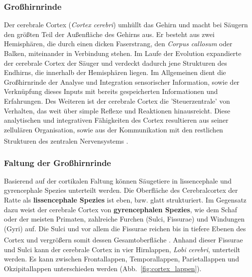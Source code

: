 \documentclass[12pt,a4paper,pdftex]{article}
\begin{document}
\subsubsection{Großhirnrinde}
\label{subsubsec:Grosshirnrinde}

Der cerebrale Cortex (\textit{Cortex cerebri})  umhüllt das Gehirn und macht bei Säugern den größten Teil der Außenfläche des Gehirns aus. Er besteht aus zwei Hemisphären, die durch einen dicken Faserstrang, den \textit{Corpus callosum}  oder Balken, miteinander in Verbindung stehen. Im Laufe der Evolution expandierte der cerebrale Cortex der Säuger und verdeckt dadurch jene Strukturen des Endhirns, die innerhalb der Hemisphären liegen. Im Allgemeinen dient die Großhirnrinde der Analyse und Integration sensorischer Information, sowie der Verknüpfung  dieses Inputs mit bereits gespeicherten Informationen und Erfahrungen. Des Weiteren ist der cerebrale Cortex die 'Steuerzentrale' von Verhalten, das weit über simple Reflexe und Reaktionen hinausreicht. Diese analytischen und integrativen Fähigkeiten des Cortex resultieren aus seiner zellulären Organisation, sowie aus der Kommunikation mit den restlichen Strukturen des zentralen Nervensystems \textsuperscript{\cite[7]{watson2010thebrain}}.


\subsubsection*{Faltung der Großhirnrinde}

Basierend auf der cortikalen Faltung können Säugetiere in lissencephale und gyrencephale Spezies unterteilt werden. Die Oberfläche des Cerebralcortex der Ratte als \textbf{lissencephale Spezies} ist eben, bzw. glatt strukturiert. Im Gegensatz dazu weist der cerebrale Cortex von \textbf{gyrencephalen Spezies}, wie dem Schaf oder der meisten Primaten, zahlreiche Furchen (Sulci, Fissurae) und Windungen (Gyri) auf. Die Sulci und vor allem die Fissurae reichen bis in tiefere Ebenen des Cortex und vergrößern somit dessen Gesamtoberfläche \textsuperscript{\cite[7]{watson2010thebrain}}. Anhand dieser Fissurae und Sulci kann der cerebrale Cortex in vier Hirnlappen, \textit{Lobi cerebri}, unterteilt werden. Es kann zwischen Frontallappen, Temporallappen, Parietallappen und Okzipitallappen unterschieden werden (Abb.~\ref{fig:cortex_lappen}).\\
\end{document}
